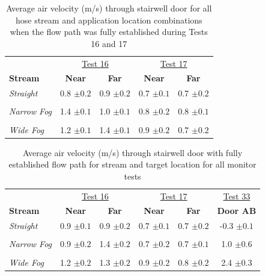 \documentclass[12pt,oneside]{book}
\begin{document}
\begin{table}[!ht]
\caption{Average air velocity (m/s) through stairwell door for all hose stream and application location combinations when the flow path was fully established during Tests 16 and 17}
\begin{tabular}{lcccc}
\toprule
 & \multicolumn{2}{c}{\underline{Test 16}} & \multicolumn{2}{c}{\underline{Test 17}}
\\
\textbf{Stream} & \textbf{Near} & \textbf{Far} & \textbf{Near} & \textbf{Far} \\
\midrule
\textit{Straight} & 
0.8 $\pm 0.2$ & 0.9 $\pm 0.2$ & 
0.7 $\pm 0.1$ & 0.7 $\pm 0.2$
\\	\multicolumn{5}{c}{}	\\
\textit{Narrow Fog} & 
1.4 $\pm 0.1$ & 1.0 $\pm 0.1$ & 
0.8 $\pm 0.2$ & 0.8 $\pm 0.1 $          
\\	\multicolumn{5}{c}{}	\\
\textit{Wide Fog} 	& 
1.2 $\pm 0.1$ & 1.4 $\pm 0.1$ & 
0.9 $\pm 0.2$ & 0.7 $\pm 0.2$
\\
\bottomrule
\end{tabular}
\label{table:Tests_16_17_BDP_A10_Avgs}
\end{table}


\begin{table}[!ht]
\caption{Average air velocity (m/s) through stairwell door with fully established flow path for stream and target location for all monitor tests}
\begin{tabular}{lccccc}
\toprule
 & \multicolumn{2}{c}{\underline{Test 16}} & \multicolumn{2}{c}{\underline{Test 17}} & \underline{Test 33}
\\
\textbf{Stream} & \textbf{Near} & \textbf{Far} & \textbf{Near} & \textbf{Far} & \textbf{Door AB}
\\ \midrule
\textit{Straight} & 0.9 $\pm0.1$ & 0.9 $\pm0.2$ & 0.7 $\pm0.1$ & 0.7 $\pm0.2$ & -0.3 $\pm0.1$
\\ \multicolumn{6}{c}{} \\
\textit{Narrow Fog} & 0.9 $\pm0.2$ & 1.4 $\pm0.2$ & 0.7 $\pm0.2$ & 0.7 $\pm0.1$ & 1.0 $\pm0.6$
\\ \multicolumn{6}{c}{} \\
\textit{Wide Fog} & 1.2 $\pm0.2$ & 1.3 $\pm0.2$ & 0.9 $\pm0.2$ & 0.8 $\pm0.2$ & 2.4 $\pm0.3$
\\ \bottomrule
\end{tabular}
\label{table:all_mon_vel_avgs}
\end{table}
\end{document}
